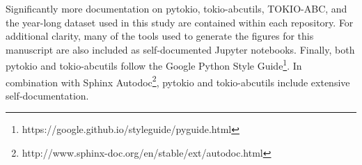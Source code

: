 Significantly more documentation on pytokio, tokio-abcutils, TOKIO-ABC, and the year-long dataset used in this study are contained within each repository.
For additional clarity, many of the tools used to generate the figures for this manuscript are also included as self-documented Jupyter notebooks.
Finally, both pytokio and tokio-abcutils follow the Google Python Style Guide\footnote{https://google.github.io/styleguide/pyguide.html}.
In combination with Sphinx Autodoc\footnote{http://www.sphinx-doc.org/en/stable/ext/autodoc.html}, pytokio and tokio-abcutils include extensive self-documentation.
